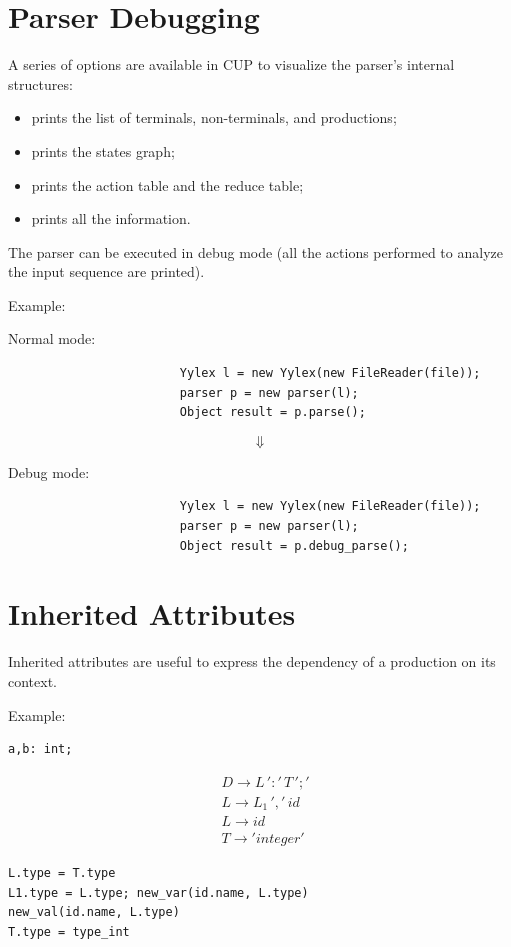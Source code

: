 \section{Parser Debugging}
A series of options are available in CUP to visualize the parser's internal structures:
\begin{itemize}
    \item
     prints the list of terminals, non-terminals, and productions;
    \item
     prints the states graph;
    \item
     prints the action table and the reduce table;
    \item
     prints all the information.
\end{itemize}
The parser can be executed in debug mode (all the actions performed to analyze the input sequence are printed).

Example:

Normal mode:
\begin{lstlisting}
                        Yylex l = new Yylex(new FileReader(file));
                        parser p = new parser(l);
                        Object result = p.parse();
\end{lstlisting}

$$
\Downarrow
$$

Debug mode:
\begin{lstlisting}
                        Yylex l = new Yylex(new FileReader(file));
                        parser p = new parser(l);
                        Object result = p.debug_parse();
\end{lstlisting}

\section{Inherited Attributes}
Inherited attributes are useful to express the dependency of a production on its context.

Example:
\begin{lstlisting}
a,b: int;
\end{lstlisting}
\begin{align*}
& D \to L \, ':' \, T \, ';' \\
& L \to L_1 \, ',' \, id \\
& L \to id \\
& T \to 'integer'
\end{align*}
\begin{lstlisting}
L.type = T.type
L1.type = L.type; new_var(id.name, L.type)
new_val(id.name, L.type)
T.type = type_int
\end{lstlisting}

